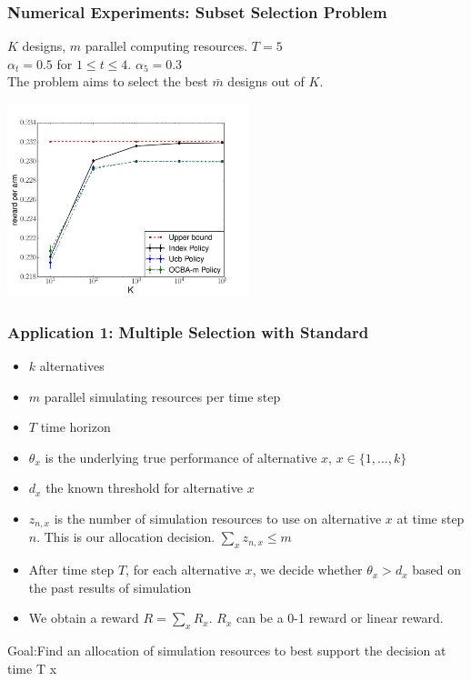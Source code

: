 \documentclass{beamer}
\begin{document}
\begin{frame}
\frametitle{Numerical Experiments: Subset Selection Problem}
$K$ designs, $m$ parallel computing resources. $T=5$\\
$\alpha_t = 0.5$ for $1\leq t\leq 4$. $\alpha_5=0.3$\\
The problem aims to select the best $\bar{m}$ designs out of $K$.
\begin{center}
\includegraphics[width=70mm]{plot_hiring1.pdf}
\end{center}
\end{frame}

\begin{frame}
\frametitle{Application 1: Multiple Selection with Standard}
\begin{itemize}
\item $k$ alternatives
\item $m$ parallel simulating resources per time step
\item $T$ time horizon
\item $\theta_x$ is the underlying true performance of alternative $x$, $x\in\{1,...,k\}$
\item $d_x$ the known threshold for alternative $x$
\item $z_{n,x}$ is the number of simulation resources to use on alternative $x$ at time step $n$. This is our allocation decision. $\sum_x z_{n,x}\leq m$
\item After time step $T$, for each alternative $x$, we decide whether $\theta_x>d_x$ based on the past results of simulation
\item We obtain a reward $R = \sum_x R_x$. $R_x$ can be a 0-1 reward or linear reward.
\end{itemize}
{\Large \color{red} Goal:Find an allocation of simulation resources to best support the decision at time T}
x\end{frame}
\end{document}
